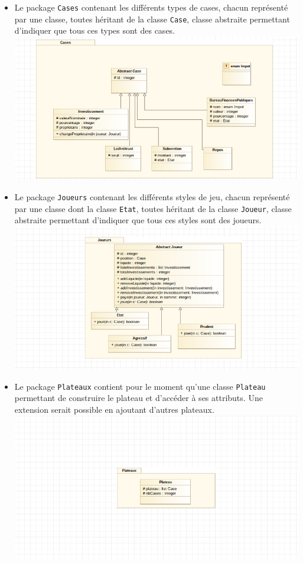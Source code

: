 \documentclass[11pt, a4paper]{report}
\begin{document}
	\begin{itemize}
		\pagebreak
		
		\item Le package \verb|Cases| contenant les différents types de cases, chacun représenté par une classe, toutes héritant de la classe \verb|Case|, classe abstraite permettant d'indiquer que tous ces types sont des cases.\\
		\includegraphics[width=1\textwidth]{images/Cases2.png}
		
		\item Le package \verb|Joueurs| contenant les différents styles de jeu, chacun représenté par une classe dont la classe \verb|Etat|, toutes héritant de la classe \verb|Joueur|, classe abstraite permettant d'indiquer que tous ces styles sont des joueurs.\\
		\includegraphics[width=1\textwidth]{images/Joueurs2.png}
		
		\pagebreak
		
		\item Le package \verb|Plateaux| contient pour le moment qu'une classe \verb|Plateau| permettant de construire le plateau et d'accéder à ses attributs. Une extension serait possible en ajoutant d'autres plateaux.\\
		\includegraphics[width=1\textwidth]{images/Plateaux2.png}
		

\end{itemize}
\end{document}
